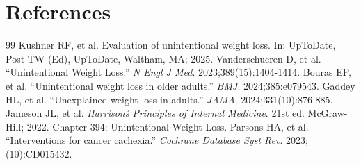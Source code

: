 \section*{References}
\begin{thebibliography}{99}
 Kushner RF, et al. Evaluation of unintentional weight loss. In: UpToDate, Post TW (Ed), UpToDate, Waltham, MA; 2025.
 Vanderschueren D, et al. ``Unintentional Weight Loss.'' \emph{N Engl J Med}. 2023;389(15):1404-1414.
 Bouras EP, et al. ``Unintentional weight loss in older adults.'' \emph{BMJ}. 2024;385:e079543.
 Gaddey HL, et al. ``Unexplained weight loss in adults.'' \emph{JAMA}. 2024;331(10):876-885.
 Jameson JL, et al. \emph{Harrison\'s Principles of Internal Medicine}. 21st ed. McGraw-Hill; 2022. Chapter 394: Unintentional Weight Loss.
 Parsons HA, et al. ``Interventions for cancer cachexia.'' \emph{Cochrane Database Syst Rev}. 2023;(10):CD015432.
\end{thebibliography}
